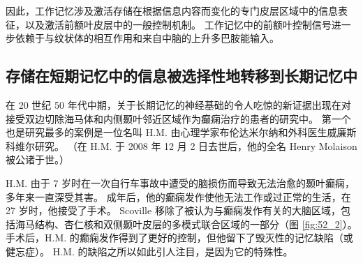 因此，工作记忆涉及激活存储在根据信息内容而变化的专门皮层区域中的信息表征，以及激活前额叶皮层中的一般控制机制。 工作记忆中的前额叶控制信号进一步依赖于与纹状体的相互作用和来自中脑的上升多巴胺能输入。

\subsection{存储在短期记忆中的信息被选择性地转移到长期记忆中}
在 20 世纪 50 年代中期，关于长期记忆的神经基础的令人吃惊的新证据出现在对接受双边切除海马体和内侧颞叶邻近区域作为癫痫治疗的患者的研究中。 第一个也是研究最多的案例是一位名叫 H.M. 由心理学家布伦达米尔纳和外科医生威廉斯科维尔研究。 （在 H.M. 于 2008 年 12 月 2 日去世后，他的全名 Henry Molaison 被公诸于世。）

H.M. 由于 7 岁时在一次自行车事故中遭受的脑损伤而导致无法治愈的颞叶癫痫，多年来一直深受其害。 成年后，他的癫痫发作使他无法工作或过正常的生活，在 27 岁时，他接受了手术。 Scoville 移除了被认为与癫痫发作有关的大脑区域，包括海马结构、杏仁核和双侧颞叶皮层的多模式联合区域的一部分（图 \ref{fig:52_2}）。 手术后，H.M. 的癫痫发作得到了更好的控制，但他留下了毁灭性的记忆缺陷（或健忘症）。 H.M. 的缺陷之所以如此引人注目，是因为它的特殊性。

